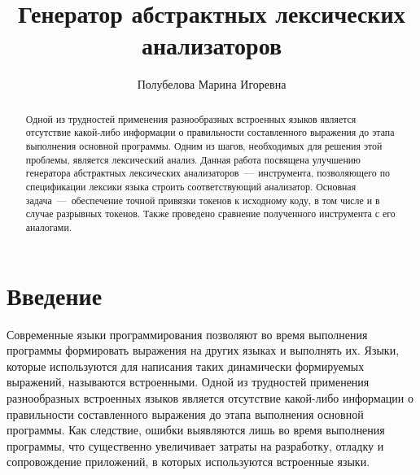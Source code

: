 %

\title{Генератор абстрактных лексических анализаторов}
%

\author{Полубелова Марина Игоревна}
%
%
%

\maketitle              %

\begin{abstract}
Одной из трудностей применения разнообразных встроенных языков является отсутствие какой-либо информации о правильности составленного выражения до этапа выполнения основной программы. Одним из шагов, необходимых для решения этой проблемы, является лексический анализ. Данная работа посвящена улучшению генератора абстрактных лексических анализаторов~---~инструмента, позволяющего по спецификации лексики языка строить соответствующий анализатор. Основная задача~---~обеспечение точной привязки токенов к исходному коду, в том числе и в случае разрывных токенов. Также проведено сравнение полученного инструмента с его аналогами.
\end{abstract}

\section*{Введение}
Современные языки программирования позволяют во время выполнения программы формировать выражения на других языках и выполнять их. 
Языки, которые используются для написания таких динамически формируемых выражений, называются встроенными. 
Одной из трудностей  применения разнообразных встроенных языков является отсутствие  какой-либо информации о правильности 
составленного выражения до этапа выполнения основной программы. Как следствие, ошибки выявляются лишь во время выполнения программы, 
что существенно увеличивает затраты на разработку, отладку и сопровождение приложений, в которых используются встроенные языки. 

